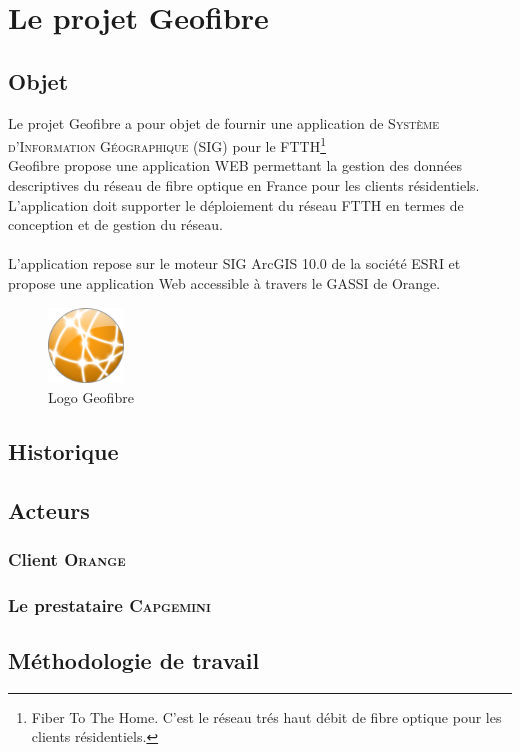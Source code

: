\chapter{Le projet Geofibre}

	\section{Objet}
Le projet Geofibre a pour objet de fournir une application de \textsc{Système d'Information Géographique (SIG)} pour le FTTH\footnote{Fiber To The Home. C'est le réseau trés haut débit de fibre optique pour les clients résidentiels.}\\
Geofibre propose une application WEB permettant la gestion des données descriptives du réseau de fibre optique en France pour les clients résidentiels.\\
L'application doit supporter le déploiement du réseau FTTH en termes de conception et de gestion du réseau. \\
\\
L'application repose sur le moteur SIG ArcGIS 10.0 de la société ESRI et propose une application Web accessible à travers le GASSI de Orange.

	\begin{figure}
		\centering
			\includegraphics[width=2cm, height=2cm]{images/logo_geofibre.png}
			\caption{Logo Geofibre}
	\end{figure}

	\section{Historique}
	\section{Acteurs}
		\subsection{Client \textsc{Orange}}
		\subsection{Le prestataire \textsc{Capgemini}}
	\section{Méthodologie de travail}
